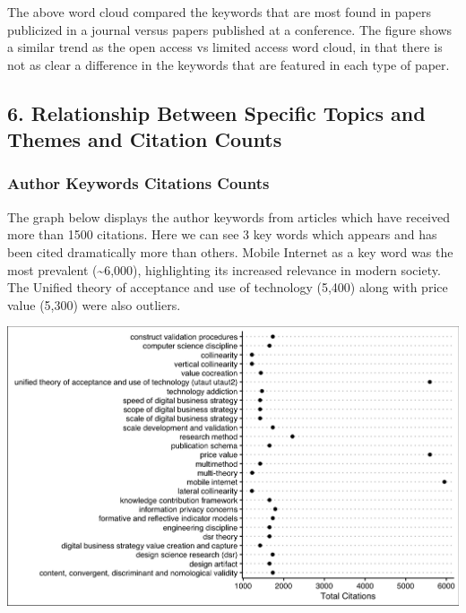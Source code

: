 \documentclass[
  letterpaper,
  DIV=11,
  numbers=noendperiod]{scrartcl}
\begin{document}
The above word cloud compared the keywords that are most found in papers
publicized in a journal versus papers published at a conference. The
figure shows a similar trend as the open access vs limited access word
cloud, in that there is not as clear a difference in the keywords that
are featured in each type of paper.

\newpage{}

\hypertarget{relationship-between-specific-topics-and-themes-and-citation-counts}{%
\subsection{\texorpdfstring{6. \textbf{Relationship Between Specific
Topics and Themes and Citation
Counts}}{6. Relationship Between Specific Topics and Themes and Citation Counts}}\label{relationship-between-specific-topics-and-themes-and-citation-counts}}

\hypertarget{author-keywords-citations-counts}{%
\subsubsection{Author Keywords Citations
Counts}\label{author-keywords-citations-counts}}

The graph below displays the author keywords from articles which have
received more than 1500 citations. Here we can see 3 key words which
appears and has been cited dramatically more than others. Mobile
Internet as a key word was the most prevalent (\textasciitilde6,000),
highlighting its increased relevance in modern society. The Unified
theory of acceptance and use of technology (5,400) along with price
value (5,300) were also outliers.

\includegraphics{images/auth_keys_scat.png}
\end{document}
